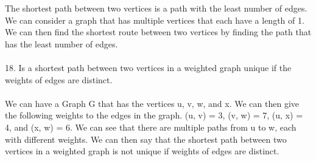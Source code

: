 \documentclass[11pt, oneside]{article}   	%
\begin{document}
The shortest path between two vertices is a path with the least number of edges. We can consider a graph that has multiple vertices that each have a length of 1. We can then find the shortest route between two vertices by finding the path that has the least number of edges. \\\\
18. Is a shortest path between two vertices in a weighted graph unique if the weights of edges are distinct. \\\\
We can have a Graph G that has the vertices u, v, w, and x. We can then give the following weights to the edges in the graph. (u, v) = 3, (v, w) = 7, (u, x) = 4, and (x, w) = 6. We can see that there are multiple paths from u to w, each with different weights. We can then say that the shortest path between two vertices in a weighted graph is not unique if weights of edges are distinct. 
\end{document}
